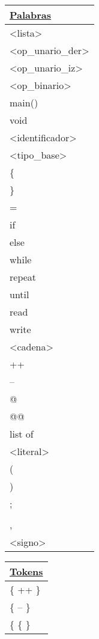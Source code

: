 \begin{center}
\begin{table}[!h]
  \centering
  \begin{tabular}{| l |}
    \hline
    \textbf{\underline{Palabras}} \\ \hline
    <lista> \\ \hline
    <op_unario_der> \\ \hline
    <op_unario_iz> \\ \hline
    <op_binario> \\ \hline
    main() \\ \hline
    void \\ \hline
    <identificador> \\ \hline
    <tipo_base> \\ \hline
    \{ \\ \hline
    \} \\ \hline
    = \\ \hline
    if \\ \hline
    else \\ \hline
    while \\ \hline
    repeat \\ \hline
    until \\ \hline
    read \\ \hline
    write \\ \hline
    <cadena> \\ \hline
    ++ \\ \hline
    -- \\ \hline
    @ \\ \hline
    @@ \\ \hline
    list of \\ \hline
    <literal> \\ \hline
    ( \\ \hline
    ) \\ \hline
    ; \\ \hline
    [ \\ \hline
    ] \\ \hline
    , \\ \hline
    <signo> \\ \hline
  \end{tabular}
  \quad
  \begin{tabular}{| l |}
    \hline
    \textbf{\underline{Tokens}} \\ \hline
    \{ ++ \} \\ \hline
    \{ -- \} \\ \hline
    \{ \{ \} \\ \hline

\end{tabular}
\end{table}
\end{center}
